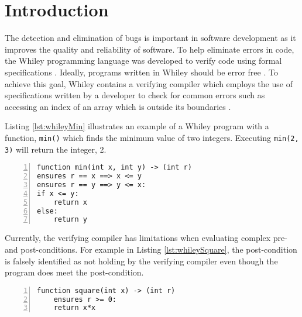 \section{Introduction}\label{section:intro}



The detection and elimination of bugs is important in software development as it improves the quality and reliability of software.
To help eliminate errors in code, the Whiley programming language was developed to verify code using formal specifications \cite{WhileyLang}.
Ideally, programs written in Whiley should be error free \cite{WhileyLang}.
To achieve this goal, Whiley contains a verifying compiler which employs the use of specifications written by a developer to check for common errors such as accessing an index of an array which is outside its boundaries \cite{WhileyLang}.

Listing \ref{lst:whileyMin} illustrates an example of a Whiley program with a function,  \texttt{min()} which finds the minimum value of two integers. Executing \texttt{min(2, 3)} will return the integer, 2.

\begin{lstlisting}[language=Whiley, tabsize=3, numbers=left,
label={lst:whileyMin}, caption={Whiley program for the min function}, captionpos=b]
function min(int x, int y) -> (int r)
ensures r == x ==> x <= y
ensures r == y ==> y <= x:
if x <= y:
	return x
else:
	return y
\end{lstlisting}

Currently, the verifying compiler has limitations when evaluating complex pre- and post-conditions.
For example in Listing \ref{lst:whileySquare}, the post-condition is falsely identified as not holding by the verifying compiler even though the program does meet the post-condition.

\begin{lstlisting}[language=Whiley, tabsize=3, numbers=left,
label={lst:whileySquare}, caption={Whiley program for the square function}, captionpos=b]
function square(int x) -> (int r)
	ensures r >= 0:
	return x*x
\end{lstlisting}

